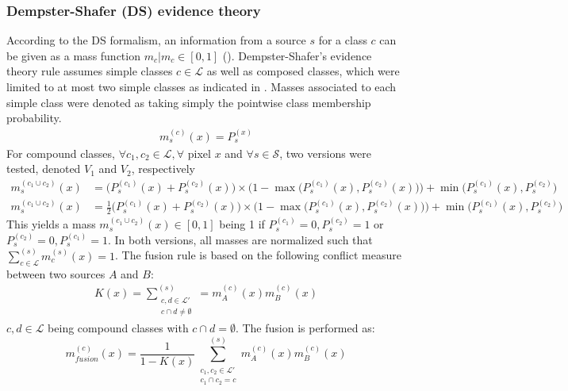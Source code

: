 \documentclass[10pt]{article}
\begin{document}
\subsubsection{Dempster-Shafer (DS) evidence theory}\label{sec:DS}
According to the DS formalism, an information from a source $s$ for a class $c$ can be given as a mass function $m_c\vert m_c\in [0,1]$ (\cite{shafer-evidence}). Dempster-Shafer's evidence theory rule assumes simple classes $c\in \mathcal{L}$ as well as composed classes, which were limited to at most two simple classes as indicated in \cite{ouerghemmi_two-step_2017}. Masses associated to each simple class were denoted as taking simply the pointwise class membership probability.
\begin{align}
    m_s^{(c)}(x)=P_s^{(x)}
\end{align}
For compound classes, $\forall c_1,c_2\in \mathcal{L}, \forall$ pixel $x$ and $\forall s\in \mathcal{S}$, two versions were tested, denoted $V_1$ and $V_2$, respectively
\begin{align}
    m_s^{(c_1\cup c_2)}(x)&=\big(P_s^{(c_1)}(x)+P_s^{(c_2)}(x)\big)\times \Big(1-\max\big(P_s^{(c_1)}(x),P_s^{(c_2)}(x)\big)\Big)+\min\big(P_s^{(c_1)}(x),P_s^{(c_2)}\big)\\
    m_s^{(c_1\cup c_2)}(x)&=\frac{1}{2}\big(P_s^{(c_1)}(x)+P_s^{(c_2)}(x)\big)\times \Big(1-\max\big(P_s^{(c_1)}(x),P_s^{(c_2)}(x)\big)\Big)+\min\big(P_s^{(c_1)}(x),P_s^{(c_2)}\big)
\end{align}
This yields a mass $m_s^{(c_1\cup c_2)}(x)\in [0,1]$ being 1 if $P_s^{(c_1)}=0, P_s^{(c_2)}=1$ or $P_s^{(c_2)}=0, P_s^{(c_1)}=1$. In both versions, all masses are normalized such that $\sum_{c \in \mathcal{L}}^{(s)}m_c^{(s)}(x)=1$.
The fusion rule is based on the following conflict measure between two sources $A$ and $B$:
\begin{align}
    K(x)=\sum_{\substack{c,d\in\mathcal{L}'\\c\cap d\neq\emptyset}}^{(s)}=m_A^{(c)}(x)m_B^{(c)}(x)
\end{align}
$c,d\in\mathcal{L}$ being compound classes with $c\cap d =\emptyset$. The fusion is performed as:
\begin{equation}
    m_{fusion}^{(c)}(x)=\frac{1}{1-K(x)}\sum_{\substack{c_1,c_2\in\mathcal{L}'\\c_1 \cap c_2 = c}}^{(s)}m_A^{(c)}(x)m_B^{(c)}(x)
\end{equation}
\end{document}
